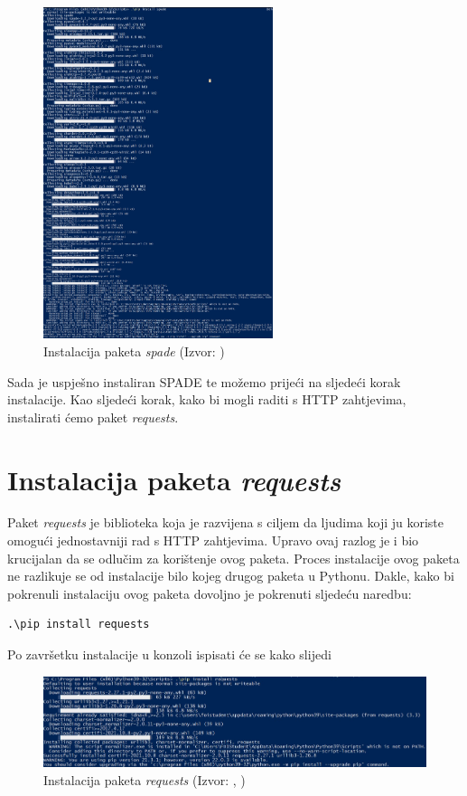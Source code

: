 \documentclass[]{foi} %
\begin{document}
\begin{figure}[h!]
    \centering
    \includegraphics[width=0.6\textwidth]{slike/spade-install.jpg}
    \caption{Instalacija paketa \textit{spade} (Izvor: \citeauthor{ispisInstalacijeSpade} \citeyear{ispisInstalacijeSpade})}
    \label{fig:instalacijaSPADE}
\end{figure}

Sada je uspješno instaliran SPADE te možemo prijeći na sljedeći korak instalacije. Kao sljedeći korak, kako bi mogli raditi s HTTP zahtjevima, instalirati ćemo paket \textit{requests}.

\section{Instalacija paketa \textit{requests}}
Paket \textit{requests} je biblioteka koja je razvijena s ciljem da ljudima koji ju koriste omogući jednostavniji rad s HTTP zahtjevima. Upravo ovaj razlog je i bio krucijalan da se odlučim za korištenje ovog paketa. Proces instalacije ovog paketa ne razlikuje se od instalacije bilo kojeg drugog paketa u Pythonu. Dakle, kako bi pokrenuli instalaciju ovog paketa dovoljno je pokrenuti sljedeću naredbu:\begin{verbatim}.\pip install requests\end{verbatim} Po završetku instalacije u konzoli ispisati će se kako slijedi

\begin{figure}[h!]
    \centering
    \includegraphics[width=1.0\textwidth]{slike/requests-install.jpg}
    \caption{Instalacija paketa \textit{requests} (Izvor: \citeauthor{ispisInstalacijeRequests}, \citeyear{ispisInstalacijeRequests})}
    \label{fig:instalacijaRequests}
\end{figure}
\end{document}

